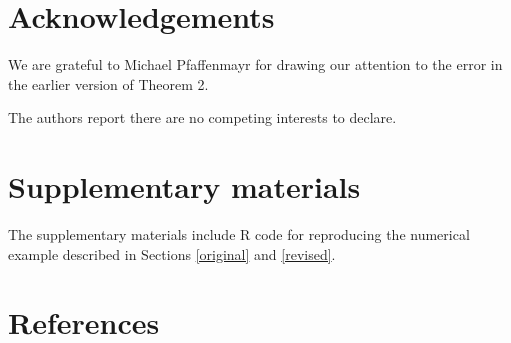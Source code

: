 \documentclass[12pt]{article}
\begin{document}
\hypertarget{acknowledgements}{%
\section*{Acknowledgements}\label{acknowledgements}}

We are grateful to Michael Pfaffenmayr for drawing our attention to the
error in the earlier version of Theorem 2.

The authors report there are no competing interests to declare.

\hypertarget{supplementary-materials}{%
\section*{Supplementary materials}\label{supplementary-materials}}

The supplementary materials include R code for reproducing the numerical
example described in Sections \ref{original} and \ref{revised}.

\hypertarget{references}{%
\section*{References}\label{references}}
\end{document}
